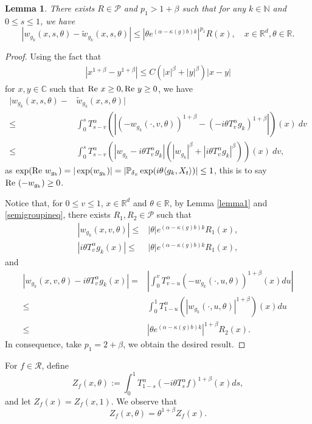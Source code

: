 \documentclass[12pt, a4paper]{amsart}
\newtheorem{lem}[thm]{Lemma}
\theoremstyle{definition}
\numberwithin{equation}{section}
\begin{document}
\begin{lem}\label{lemma2}
There exists $R \in \mathcal{P}$ and $p_1 >1+\beta$ such that for any $k \in \mathbb{N}$ and $0\leq s \leq 1$, we have 
$$|w_{g_k}(x,s,\theta)-\tilde{w}_{g_k}(x,s,\theta)|\leq |\theta e^{(\alpha-\kappa(g)b)k}|^{p_1}R(x),\quad x\in \mathbb{R}^d,\theta\in \mathbb{R}.$$
\end{lem}
\begin{proof}
 Using the fact that 
 \begin{align}
      |x^{1+\beta}-y^{1+\beta}|\leq C (|x|^{\beta}+|y|^{\beta})|x-y|\label{element}
 \end{align}
for $x,y \in \mathbb{C}$ such that ${\rm Re~} x \geq 0, {\rm Re~} y\geq 0$, we have
\begin{align*}
   |w_{g_k}(x,s,\theta)-&\tilde{w}_{g_k}(x,s,\theta)|\\
   \leq &\int_0^s T_{s-v}^{\alpha}\left(|(-w_{g_k}(\cdot,v,\theta))^{1+\beta}-(-i\theta T_v^{\alpha}g_k)^{1+\beta}|\right)(x)~dv\\
   \leq &\int_0^s T_{s-v}^{\alpha}\left( |w_{g_k}-i\theta T_v^{\alpha}g_{k}|\left(|w_{g_k}|^{\beta}+|i\theta T_v^{\alpha}g_k|^{\beta}\right)\right)(x)~dv, 
\end{align*}
as $\exp({\rm Re~}w_{g_k})=|\exp(w_{g_k})|=\left|\mathbb{P}_{\delta_x}\exp(i\theta \langle  g_k,X_t\rangle)\right|\leq 1$, this is to say ${\rm Re~}(-w_{g_k})\geq0$.

Notice that, for $0\leq v \leq 1$, $x\in \mathbb{R}^d$ and $\theta \in \mathbb{R}$, by Lemma \ref{lemma1} and \eqref{semigroupineq}, there exists $R_1,R_2\in \mathcal{P}$ such that
\begin{align*}
    |w_{g_{k}}(x,v,\theta)|\leq &|\theta|e^{(\alpha-\kappa(g)b)k}R_1(x),\\
    |i\theta T_v^{\alpha}g_k(x)|\leq & |\theta|e^{(\alpha-\kappa(g)b)k}R_1(x),
\end{align*}
and
\begin{align}
   |w_{g_{k}}(x,v,\theta)-i\theta T_v^{\alpha}g_k(x)|=&\left| \int_0^v T^{\alpha}_{v-u}(-w_{g_k}(\cdot,u,\theta))^{1+\beta}(x)du\right| \nonumber\\ 
   \leq & \int_0^1 T_{1-u}^{\alpha}(|w_{g_k}(\cdot,u,\theta)|^{1+\beta})(x)du \nonumber \\
   \leq & |\theta e^{(\alpha-\kappa(g)b)k}|^{1+\beta}R_2(x). \label{Zineq}
\end{align}
In consequence, take $p_1=2+\beta$, we obtain the desired result.
\end{proof}
For $f\in \mathcal{R}$, define 
$$Z_f(x,\theta):=\int_0^1 T^{\alpha}_{1-s}(-i\theta T_s^{\alpha}f)^{1+\beta}(x)ds ,$$
and let $Z_f(x)=Z_f(x,1)$. We observe that
\begin{equation}\label{zfunction}
    Z_f(x,\theta)=\theta^{1+\beta}Z_f(x).
\end{equation}
\end{document}
